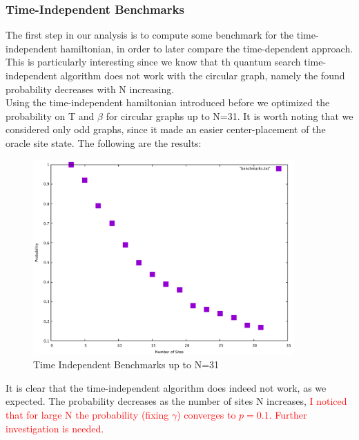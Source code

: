 \documentclass[aps,pra,reprint, onecolumn]{revtex4-2}
\newcommand{\red}[1]{\textcolor{red}{#1}}
\begin{document}
\subsubsection{\textbf{Time-Independent Benchmarks}}
The first step in our analysis is to compute some benchmark for the time-independent hamiltonian, in order to later compare the time-dependent approach. This is particularly interesting since we know that th quantum search time-independent algorithm does not work with the circular graph, namely the found probability decreases with N increasing. \\
Using the time-independent hamiltonian introduced before we optimized the probability on T and $\beta$ for circular graphs up to N=31. It is worth noting that we considered only odd graphs, since it made an easier center-placement of the oracle site state. The following are the results:\\
\begin{figure}[ht]
\includegraphics[width=10cm]{./figures/benchmarks.pdf}
\caption{Time Independent Benchmarks up to N=31}
\end{figure}

It is clear that the time-independent algorithm does indeed not work, as we expected. The probability decreases as the number of sites N increases, \red{I noticed that for large N the probability (fixing $\gamma$) converges to $p=0.1$. Further investigation is needed.}
\end{document}

